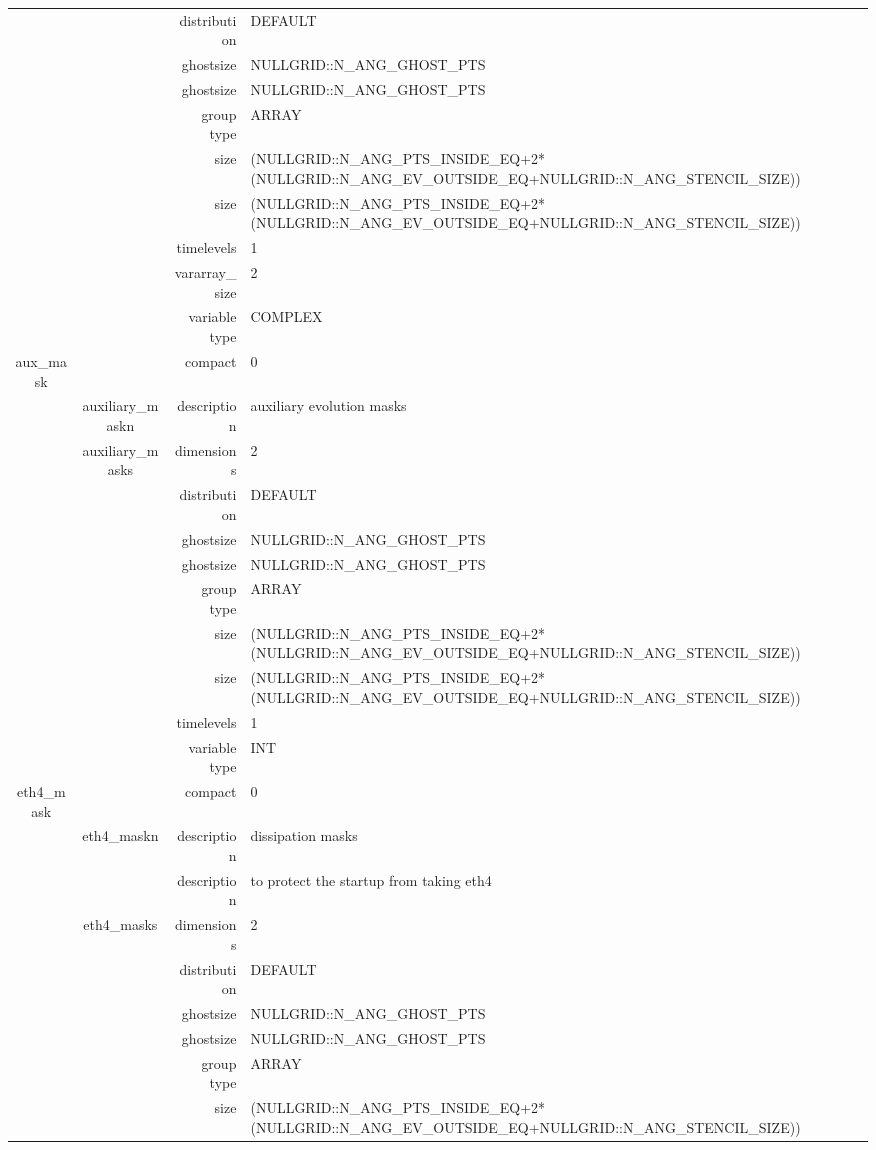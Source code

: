 \begin{tabular*}{150mm}{|c|c@{\extracolsep{\fill}}|rl|}
 &  & distribution & DEFAULT \\ 
 &  & ghostsize & NULLGRID::N\_ANG\_GHOST\_PTS \\ 
& ~ & ghostsize & NULLGRID::N\_ANG\_GHOST\_PTS \\ 
 &  & group type & ARRAY \\ 
 &  & size & (NULLGRID::N\_ANG\_PTS\_INSIDE\_EQ+2*(NULLGRID::N\_ANG\_EV\_OUTSIDE\_EQ+NULLGRID::N\_ANG\_STENCIL\_SIZE)) \\ 
& ~ & size & (NULLGRID::N\_ANG\_PTS\_INSIDE\_EQ+2*(NULLGRID::N\_ANG\_EV\_OUTSIDE\_EQ+NULLGRID::N\_ANG\_STENCIL\_SIZE)) \\ 
 &  & timelevels & 1 \\ 
 &  & vararray\_size & 2 \\ 
 &  & variable type & COMPLEX \\ 
\hline 
aux\_mask &  & compact & 0 \\ 
 & auxiliary\_maskn & description & auxiliary evolution masks \\ 
 & auxiliary\_masks & dimensions & 2 \\ 
 &  & distribution & DEFAULT \\ 
 &  & ghostsize & NULLGRID::N\_ANG\_GHOST\_PTS \\ 
& ~ & ghostsize & NULLGRID::N\_ANG\_GHOST\_PTS \\ 
 &  & group type & ARRAY \\ 
 &  & size & (NULLGRID::N\_ANG\_PTS\_INSIDE\_EQ+2*(NULLGRID::N\_ANG\_EV\_OUTSIDE\_EQ+NULLGRID::N\_ANG\_STENCIL\_SIZE)) \\ 
& ~ & size & (NULLGRID::N\_ANG\_PTS\_INSIDE\_EQ+2*(NULLGRID::N\_ANG\_EV\_OUTSIDE\_EQ+NULLGRID::N\_ANG\_STENCIL\_SIZE)) \\ 
 &  & timelevels & 1 \\ 
 &  & variable type & INT \\ 
\hline 
eth4\_mask &  & compact & 0 \\ 
 & eth4\_maskn & description & dissipation masks \\ 
& ~ & description &  to protect the startup from taking eth4 \\ 
 & eth4\_masks & dimensions & 2 \\ 
 &  & distribution & DEFAULT \\ 
 &  & ghostsize & NULLGRID::N\_ANG\_GHOST\_PTS \\ 
& ~ & ghostsize & NULLGRID::N\_ANG\_GHOST\_PTS \\ 
 &  & group type & ARRAY \\ 
 &  & size & (NULLGRID::N\_ANG\_PTS\_INSIDE\_EQ+2*(NULLGRID::N\_ANG\_EV\_OUTSIDE\_EQ+NULLGRID::N\_ANG\_STENCIL\_SIZE)) \\ 

\end{tabular*}
